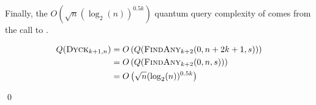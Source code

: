 \begin{appendix}
\begin{tproof}
{            Finally, the $O\left( \sqrt{n}(\log_2(n))^{0.5k} \right)$ quantum query complexity of  comes from the
            call to .

            \begin{align*}
                Q(\textrm{\textsc{Dyck$_{k+1,n}$}}) & = O\left(Q(\textrm{\textsc{FindAny$_{k+2}$}}(0,n+2k+1,s))\right) \\
                                         & = O\left(Q(\textrm{\textsc{FindAny$_{k+2}$}}(0, n, s))\right)    \\
                                         & = O\left( \sqrt{n}(\log_2(n))^{0.5k} \right)
            \end{align*}

        }


        \qed
    \end{tproof}

\end{appendix}